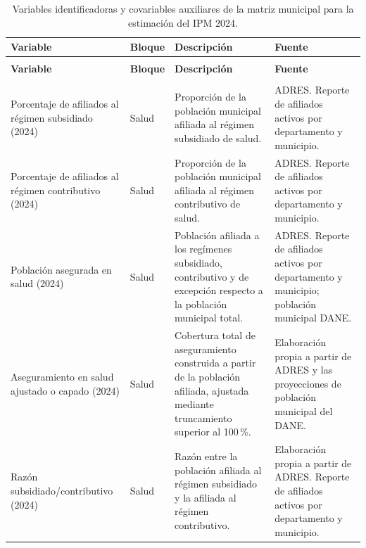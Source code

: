 \begin{longtable}{
>{\raggedright\arraybackslash}p{2.5cm}
>{\raggedright\arraybackslash}p{1.5cm}
>{\raggedright\arraybackslash}p{3.8cm}
>{\raggedright\arraybackslash}p{4.4cm}
}

\caption{Variables identificadoras y covariables auxiliares de la matriz municipal para la estimación del IPM 2024.}
\label{tab:matriz-auxiliar-ipm}\\

\hline
\textbf{Variable} &
\textbf{Bloque} &
\textbf{Descripción} &
\textbf{Fuente} \\
\hline
\endfirsthead

\multicolumn{4}{c}{\tablename\ \thetable\ -- continuación}\\

\hline
\textbf{Variable} &
\textbf{Bloque} &
\textbf{Descripción} &
\textbf{Fuente} \\
\hline
\endhead

\hline
\multicolumn{4}{r}{\textit{Continúa en la siguiente página}}\\
\endfoot

\hline
\endlastfoot

Porcentaje de afiliados al régimen subsidiado (2024)
& Salud
& Proporción de la población municipal afiliada al régimen subsidiado de salud.
& ADRES. Reporte de afiliados activos por departamento y municipio. \\

Porcentaje de afiliados al régimen contributivo (2024)
& Salud
& Proporción de la población municipal afiliada al régimen contributivo de salud.
& ADRES. Reporte de afiliados activos por departamento y municipio. \\

Población asegurada en salud (2024)
& Salud
& Población afiliada a los regímenes subsidiado, contributivo y de excepción respecto a la población municipal total.
& ADRES. Reporte de afiliados activos por departamento y municipio; población municipal DANE. \\

Aseguramiento en salud ajustado o capado (2024)
& Salud
& Cobertura total de aseguramiento construida a partir de la población afiliada, ajustada mediante truncamiento superior al 100\,\%.
& Elaboración propia a partir de ADRES y las proyecciones de población municipal del DANE. \\

Razón subsidiado/contributivo (2024)
& Salud
& Razón entre la población afiliada al régimen subsidiado y la afiliada al régimen contributivo.
& Elaboración propia a partir de ADRES. Reporte de afiliados activos por departamento y municipio. \\


\end{longtable}
